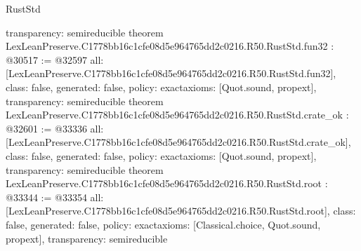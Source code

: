 \begin{lexlean}{RustStd}
\begin{coremodule}
{  transparency: semireducible
}
theorem LexLeanPreserve.C1778bb16c1cfe08d5e964765dd2c0216.R50.RustStd.fun32 : @30517 := @32597 {
  all: [LexLeanPreserve.C1778bb16c1cfe08d5e964765dd2c0216.R50.RustStd.fun32],
  class: false,
  generated: false,
  policy: exact{axioms: [Quot.sound, propext]},
  transparency: semireducible
}
theorem LexLeanPreserve.C1778bb16c1cfe08d5e964765dd2c0216.R50.RustStd.crate_ok : @32601 := @33336 {
  all: [LexLeanPreserve.C1778bb16c1cfe08d5e964765dd2c0216.R50.RustStd.crate_ok],
  class: false,
  generated: false,
  policy: exact{axioms: [Quot.sound, propext]},
  transparency: semireducible
}
theorem LexLeanPreserve.C1778bb16c1cfe08d5e964765dd2c0216.R50.RustStd.root : @33344 := @33354 {
  all: [LexLeanPreserve.C1778bb16c1cfe08d5e964765dd2c0216.R50.RustStd.root],
  class: false,
  generated: false,
  policy: exact{axioms: [Classical.choice, Quot.sound, propext]},
  transparency: semireducible
}


\end{coremodule}
\end{lexlean}
